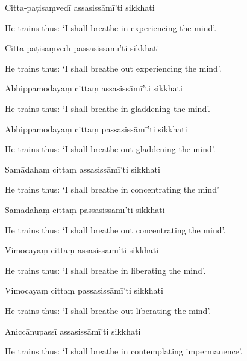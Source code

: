 Citta-paṭisaṃvedī assasissāmī'ti sikkhati

\begin{english}
  He trains thus: `I shall breathe in experiencing the mind'.
\end{english}

Citta-paṭisaṃvedī passasissāmī'ti sikkhati

\begin{english}
  He trains thus: `I shall breathe out experiencing the mind'.
\end{english}

Abhippamodayaṃ cittaṃ assasissāmī'ti sikkhati

\begin{english}
  He trains thus: `I shall breathe in gladdening the mind'.
\end{english}

Abhippamodayaṃ cittaṃ passasissāmī'ti sikkhati

\begin{english}
  He trains thus: `I shall breathe out gladdening the mind'.
\end{english}

Samādahaṃ cittaṃ assasissāmī'ti sikkhati

\begin{english}
  He trains thus: `I shall breathe in concentrating the mind'
\end{english}

Samādahaṃ cittaṃ passasissāmī'ti sikkhati

\begin{english}
  He trains thus: `I shall breathe out concentrating the mind'.
\end{english}

Vimocayaṃ cittaṃ assasissāmī'ti sikkhati

\begin{english}
  He trains thus: `I shall breathe in liberating the mind'.
\end{english}

Vimocayaṃ cittaṃ passasissāmī'ti sikkhati

\begin{english}
  He trains thus: `I shall breathe out liberating the mind'.
\end{english}

Aniccānupassī assasissāmī'ti sikkhati

\begin{english}
  He trains thus: `I shall breathe in contemplating impermanence'.
\end{english}

